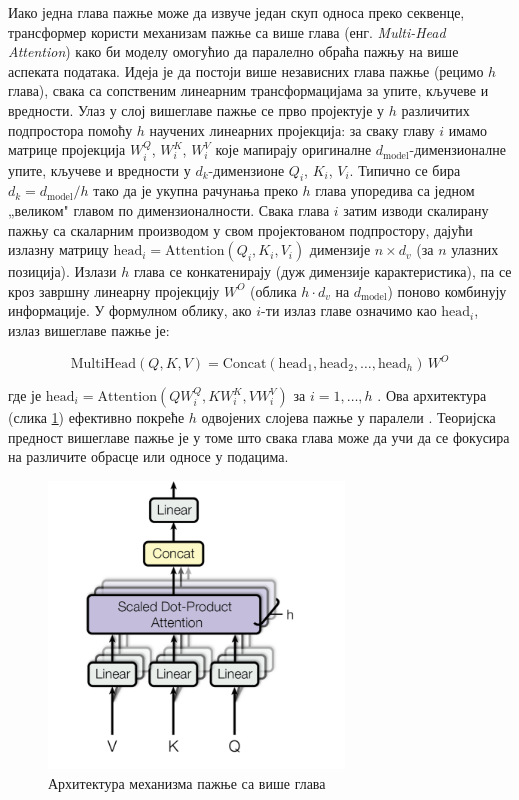 Иако једна глава пажње може да извуче један скуп односа преко секвенце, трансформер користи механизам пажње са више глава (енг. \textit{Multi-Head Attention}) како би моделу омогућио да паралелно обраћа пажњу на више аспеката података. Идеја је да постоји више независних глава пажње (рецимо $h$ глава), свака са сопственим линеарним трансформацијама за упите, кључеве и вредности. Улаз у слој вишеглаве пажње се прво пројектује у $h$ различитих подпростора помоћу $h$ научених линеарних пројекција: за сваку главу $i$ имамо матрице пројекција $W_i^Q$, $W_i^K$, $W_i^V$ које мапирају оригиналне $d_{\text{model}}$-димензионалне упите, кључеве и вредности у $d_k$-димензионе $Q_i$, $K_i$, $V_i$. Типично се бира $d_k = d_{\text{model}}/h$ тако да је укупна рачунања преко $h$ глава упоредива са једном „великом" главом по димензионалности. Свака глава $i$ затим изводи скалирану пажњу са скаларним производом у свом пројектованом подпростору, дајући излазну матрицу $\text{head}_i = \text{Attention}(Q_i, K_i, V_i)$ димензије $n \times d_v$ (за $n$ улазних позиција). Излази $h$ глава се конкатенирају (дуж димензије карактеристика), па се кроз завршну линеарну пројекцију $W^O$ (облика $h\cdot d_v$ на $d_{\text{model}}$) поново комбинују информације. У формулном облику, ако $i$-ти излаз главе означимо као $\text{head}_i$, излаз вишеглаве пажње је:

\begin{equation}
\text{MultiHead}(Q, K, V) = \text{Concat}(\text{head}_1, \text{head}_2, \dots, \text{head}_h)\,W^O
\label{eq:multihead}
\end{equation}

где је $\text{head}_i = \text{Attention}(Q W_i^Q, K W_i^K, V W_i^V)$ за $i=1,\dots,h$ \cite{vaswani_attention_2017}. Ова архитектура (слика \ref{fig:multi_head_attention}) ефективно покреће $h$ одвојених слојева пажње у паралели \cite{vaswani_attention_2017}. Теоријска предност вишеглаве пажње је у томе што свака глава може да учи да се фокусира на различите обрасце или односе у подацима.

\begin{figure}[h]
    \centering
    \includegraphics[width=0.7\textwidth]{images/multi-head-attention.png}
    \caption{Архитектура механизма пажње са више глава}
    \label{fig:multi_head_attention}
\end{figure}

